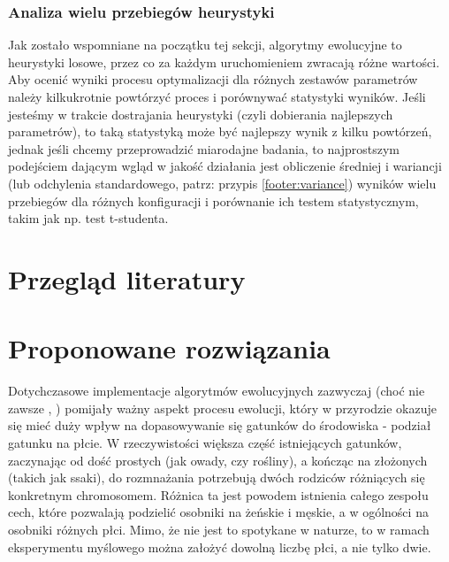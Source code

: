 \documentclass[twoside]{iisthesis}
\begin{document}
\subsection{Analiza wielu przebiegów heurystyki}

Jak zostało wspomniane na początku tej sekcji, algorytmy ewolucyjne to heurystyki losowe, przez co za każdym uruchomieniem zwracają różne wartości. Aby ocenić wyniki procesu optymalizacji dla różnych zestawów parametrów należy kilkukrotnie powtórzyć proces i porównywać statystyki wyników. Jeśli jesteśmy w trakcie dostrajania heurystyki (czyli dobierania najlepszych parametrów), to taką statystyką może być najlepszy wynik z kilku powtórzeń, jednak jeśli chcemy przeprowadzić miarodajne badania, to najprostszym podejściem dającym wgląd w jakość działania jest obliczenie średniej i wariancji (lub odchylenia standardowego, patrz: przypis \ref{footer:variance}) wyników wielu przebiegów dla różnych konfiguracji i porównanie ich testem statystycznym, takim jak np. test t-studenta.

\chapter{Przegląd literatury} \label{chapter:literature}


\chapter{Proponowane rozwiązania} \label{chapter:proposed}

Dotychczasowe implementacje algorytmów ewolucyjnych zazwyczaj (choć nie zawsze \cite{GGA}, \cite{SexualGA}) pomijały ważny aspekt procesu ewolucji, który w przyrodzie okazuje się mieć duży wpływ na dopasowywanie się gatunków do środowiska - podział gatunku na płcie. 
W rzeczywistości większa część istniejących gatunków, zaczynając od dość prostych (jak owady, czy rośliny), a kończąc na złożonych (takich jak ssaki), do rozmnażania potrzebują dwóch rodziców różniących się konkretnym chromosomem. 
Różnica ta jest powodem istnienia całego zespołu cech, które pozwalają podzielić osobniki na żeńskie i męskie, a w ogólności na osobniki różnych płci. 
Mimo, że nie jest to spotykane w naturze, to w ramach eksperymentu myślowego można założyć dowolną liczbę płci, a nie tylko dwie.
\end{document}
